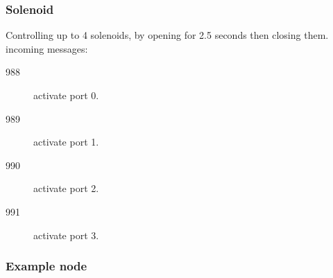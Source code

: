 \subsubsection{Solenoid}
Controlling up to 4 solenoids, by opening for 2.5 seconds then closing them.
incoming messages:
\begin{description}
  \item[988] activate port 0.
  \item[989] activate port 1.
  \item[990] activate port 2.
  \item[991] activate port 3.
\end{description}




\subsubsection{Example node}



